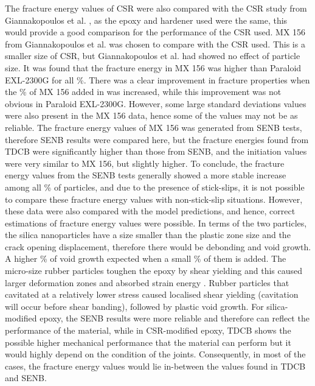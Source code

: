 \documentclass[numbers=noendperiod,chapterprefix=on]{icldt} %
\begin{document}
{The fracture energy values of CSR were also compared with the CSR study from Giannakopoulos et al. \cite{Giannakopoulos2011}, as the epoxy and hardener used were the same, this would provide a good comparison for the performance of the CSR used. 
MX 156 from Giannakopoulos et al. \cite{Giannakopoulos2011} was chosen to compare with the CSR used. This is a smaller size of CSR, but Giannakopoulos et al. had showed no effect of particle size. It was found that the fracture energy in MX 156 was higher than Paraloid EXL-2300G for all \%. There was a clear improvement in fracture properties when the \% of MX 156 added in was increased, while this improvement was not obvious in Paraloid EXL-2300G. However, some large standard deviations values were also present in the MX 156 data, hence some of the values may not be as reliable. The fracture energy values of MX 156 was generated from SENB tests, therefore SENB results were compared here, but the fracture energies found from TDCB were significantly higher than those from SENB, and the initiation values were very similar to MX 156, but slightly higher. 
To conclude, the fracture energy values from the SENB tests generally showed a more stable increase among all \% of particles, and due to the presence of stick-slips, it is not possible to compare these fracture energy values with non-stick-slip situations. However, these data were also compared with the model predictions, and hence, correct estimations of fracture energy values were possible. 
In terms of the two particles, the silica nanoparticles have a size smaller than the plastic zone size and the crack opening displacement, therefore there would be debonding and void growth. A higher \% of void growth expected when a small \% of them is added. 
The micro-size rubber particles toughen the epoxy by shear yielding and this caused larger deformation zones and absorbed strain energy \cite{ISO13586}. Rubber particles that cavitated at a relatively lower stress caused localised shear yielding (cavitation will occur before shear banding), followed by plastic void growth. 
For silica-modified epoxy, the SENB results were more reliable and therefore can reflect the performance of the material, while in CSR-modified epoxy, TDCB shows the possible higher mechanical performance that the material can perform but it would highly depend on the condition of the joints. Consequently, in most of the cases, the fracture energy values would lie in-between the values found in TDCB and SENB.


}
\end{document}
